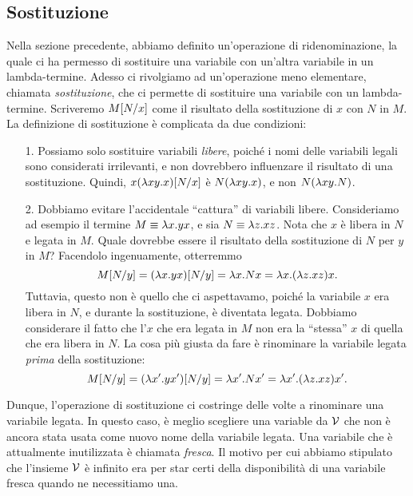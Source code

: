 \documentclass{article}
\begin{document}
\subsection{Sostituzione}\label{ssec-sostituzione}

Nella sezione precedente, abbiamo definito un'operazione di 
ridenominazione, la quale ci ha permesso di sostituire una variabile 
con un'altra variabile in un lambda-termine. Adesso ci rivolgiamo ad 
un'operazione meno elementare, chiamata {\em sostituzione}, che ci 
permette di sostituire una variabile con un lambda-termine. Scriveremo
$M[N/x]$ come il risultato della sostituzione di $x$ con $N$ 
in $M$. La definizione di sostituzione \`e complicata da due condizioni:
\begin{enumerate}
\item[1.] Possiamo solo sostituire variabili {\em libere}, poich\'e i nomi
delle variabili legali sono considerati irrilevanti, e non
dovrebbero influenzare il risultato di una sostituzione. Quindi, $x(\lambda
    xy.x)[N/x]$ \`e $N(\lambda xy.x)$, e non $N(\lambda xy.N)$.
\item[2.] Dobbiamo evitare l'accidentale ``cattura'' di variabili
libere. Consideriamo ad esempio il termine $M\equiv\lambda x.yx$, e sia
  $N\equiv\lambda z.xz$. Nota che $x$ \`e libera in $N$ e legata in $M$.
Quale dovrebbe essere il risultato della sostituzione di $N$ per $y$ in $M$?
Facendolo ingenuamente, otterremmo
  \[ M[N/y]=(\lambda x.yx)[N/y]=
     \lambda x.Nx=\lambda x.(\lambda z.xz)x. 
  \]
  Tuttavia, questo non \`e quello che ci aspettavamo, poich\'e la variabile $x$
  era libera in $N$, e durante la sostituzione, \`e diventata legata. Dobbiamo
  considerare il fatto che l'$x$ che era legata in $M$ non era la 
  ``stessa'' $x$ di quella che era libera in $N$. La cosa pi\`u giusta da fare
\`e rinominare la variabile legata {\em prima} della sostituzione:
  \[ M[N/y]=(\lambda x'.yx')[N/y]=
     \lambda x'.Nx'=\lambda x'.(\lambda z.xz)x'. 
  \]
\end{enumerate}

Dunque, l'operazione di sostituzione ci costringe delle volte a rinominare
una variabile legata. In questo caso, \`e meglio scegliere una variable da
${\cal V}$ che non \`e ancora stata usata come nuovo nome della variabile
legata. Una variabile che \`e attualmente inutilizzata \`e chiamata {\em fresca}.
Il motivo per cui abbiamo stipulato che l'insieme ${\cal V}$ \`e infinito era per
star certi della disponibilit\`a di una variabile fresca quando ne necessitiamo una.
\end{document}
